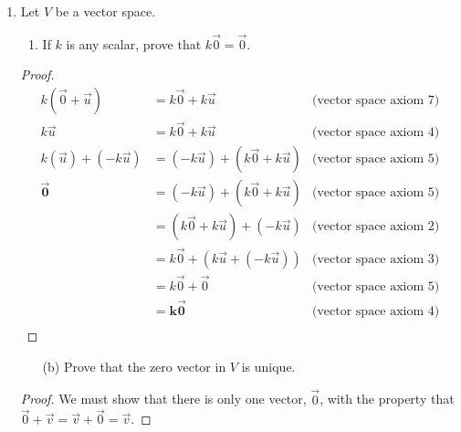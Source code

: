 \documentclass[12pt]{article}
\begin{document}
\begin{enumerate}
\begin{proof}
                      Therefore $W$ is a subspace of $F(-\infty, \infty)$ and hence is a vector space.
              \end{proof}
        \item
              Let $V$ be a vector space.
              \begin{enumerate}
                      \item If $k$ is any scalar, prove that $k\vec{0} = \vec{0}$.
              \end{enumerate}
              \begin{proof}
                      \begin{align*}
                              k(\vec{0} + \vec{u})
                               & = k\vec{0} + k\vec{u}                 & \textrm{(vector space axiom 7)} \\
                              k\vec{u}
                               & = k\vec{0} + k\vec{u}                 & \textrm{(vector space axiom 4)} \\
                              k(\vec{u}) + (-k\vec{u})
                               & = (-k\vec{u}) + (k\vec{0} + k\vec{u}) & \textrm{(vector space axiom 5)} \\
                              \vec{\mathbf{0}}
                               & = (-k\vec{u}) + (k\vec{0} + k\vec{u}) & \textrm{(vector space axiom 5)} \\
                               & = (k\vec{0} + k\vec{u}) + (-k\vec{u}) & \textrm{(vector space axiom 2)} \\
                               & = k\vec{0} + (k\vec{u} + (-k\vec{u})) & \textrm{(vector space axiom 3)} \\
                               & = k\vec{0} + \vec{0}                  & \textrm{(vector space axiom 5)} \\
                               & = \mathbf{k}\vec{\mathbf{0}}          & \textrm{(vector space axiom 4)} \\
                      \end{align*}
              \end{proof}
              \begin{enumerate}
                      \item[(b)] Prove that the zero vector in $V$ is unique.
              \end{enumerate}
              \begin{proof}
                      We must show that there is only one vector, $\vec{0}$, with the property that \\
                      $\vec{0} + \vec{v} = \vec{v} + \vec{0} = \vec{v}$.


\end{proof}
\end{enumerate}
\end{document}
